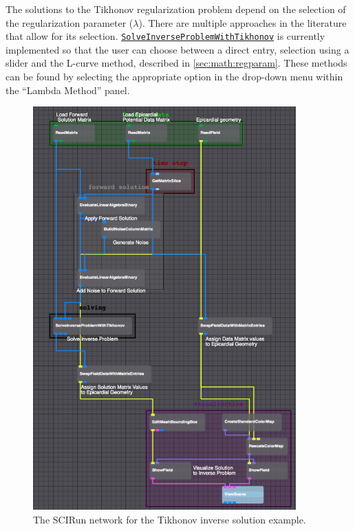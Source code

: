     
    
    The solutions to the Tikhonov regularization problem depend on the selection of the regularization parameter ($\lambda$).
    There are multiple approaches in the literature that allow for its selection.
    \href{http://scirundocwiki.sci.utah.edu/SCIRunDocs/index.php/CIBC:Documentation:SCIRun:Reference:BioPSE:SolveInverseProblemWithTikhonov}{{\tt SolveInverseProblemWithTikhonov}} is currently implemented so that the user can choose between a direct entry, selection using a slider and the L-curve method, described in \autoref{sec:math:regparam}.
    These methods can be found by selecting the appropriate option in the drop-down menu within the ``Lambda Method'' panel.
    
    
    \begin{figure}
        \begin{center}
        \includegraphics[width=0.9\textwidth]{ECGToolkitGuide_figures/TikhonovNetwork.png}
        \caption{The SCIRun network for the Tikhonov inverse solution example.}
        \label{TikhonovNetworkExample}
        \end{center}
    \end{figure}
    
